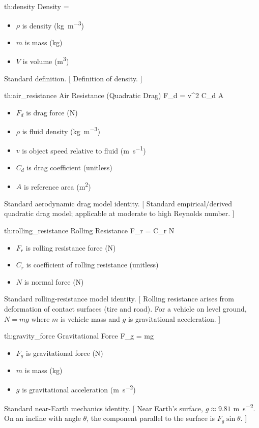 \documentclass[11pt]{article}
\numberwithin{equation}{section}
\newcounter{theory}
\begin{document}

\theory
{th:density}
{Density}
{\rho = }
{
\begin{itemize}
  \item $\rho$ is density (\si{\kilogram\per\meter\cubed})
  \item $m$ is mass (\si{\kilogram})
  \item $V$ is volume (\si{\meter\cubed})
\end{itemize}
}
{Standard definition.}
[
Definition of density.
]

\theory
{th:air_resistance}
{Air Resistance (Quadratic Drag)}
{F_d = \rho v^2 C_d A}
{
\begin{itemize}
  \item $F_d$ is drag force (\si{\newton})
  \item $\rho$ is fluid density (\si{\kilogram\per\meter\cubed})
  \item $v$ is object speed relative to fluid (\si{\meter\per\second})
  \item $C_d$ is drag coefficient (unitless)
  \item $A$ is reference area (\si{\meter\squared})
\end{itemize}
}
{Standard aerodynamic drag model identity.}
[
Standard empirical/derived quadratic drag model; applicable at moderate to high Reynolds number.
]

\theory
{th:rolling_resistance}
{Rolling Resistance}
{F_r = C_r N}
{
\begin{itemize}
  \item $F_r$ is rolling resistance force (\si{\newton})
  \item $C_r$ is coefficient of rolling resistance (unitless)
  \item $N$ is normal force (\si{\newton})
\end{itemize}
}
{Standard rolling-resistance model identity.}
[
Rolling resistance arises from deformation of contact surfaces (tire and road). For a vehicle on level ground, $N = mg$ where $m$ is vehicle mass and $g$ is gravitational acceleration.
]

\theory
{th:gravity_force}
{Gravitational Force}
{F_g = mg}
{
\begin{itemize}
  \item $F_g$ is gravitational force (\si{\newton})
  \item $m$ is mass (\si{\kilogram})
  \item $g$ is gravitational acceleration (\si{\meter\per\second\squared})
\end{itemize}
}
{Standard near-Earth mechanics identity.}
[
Near Earth's surface, $g \approx 9.81$ \si{\meter\per\second\squared}. On an incline with angle $\theta$, the component parallel to the surface is $F_g \sin\theta$.
]
\end{document}
